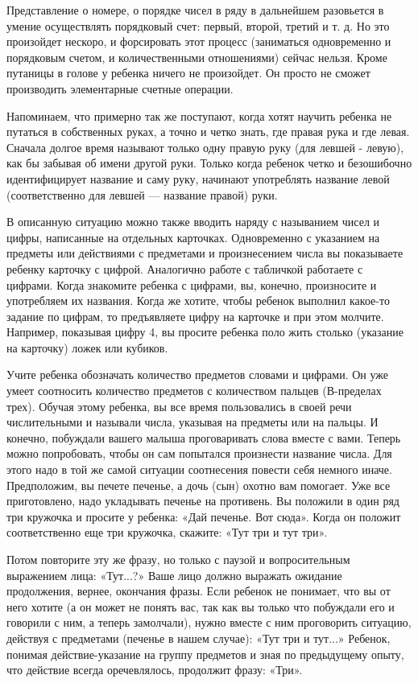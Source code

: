 \documentclass{book}
\begin{document}
Представление о номере, о порядке чисел в ряду в дальнейшем разовьется в
умение осуществлять порядковый счет: первый, второй, третий и т. д. Но
это произойдет нескоро, и форсировать этот процесс (заниматься
одновременно и порядковым счетом, и количественными отношениями) сейчас
нельзя. Кроме путаницы в голове у ребенка ничего не произойдет. Он
просто не сможет производить элементарные счетные операции.

Напоминаем, что примерно так же поступают, когда хотят научить ребенка
не путаться в собственных руках, а точно и четко знать, где правая рука
и где левая. Сначала долгое время называют только одну правую руку (для
левшей - левую), как бы забывая об имени другой руки. Только когда
ребенок четко и безошибочно идентифицирует название и саму руку,
начинают употреблять название левой (соответственно для левшей ---
название правой) руки.

В описанную ситуацию можно также вводить наряду с называнием чисел и
цифры, написанные на отдельных карточках. Одновременно с указанием на
предметы или действиями с предметами и произнесением числа вы
показываете ребенку карточку с цифрой. Аналогично работе с табличкой
работаете с цифрами. Когда знакомите ребенка с цифрами, вы, конечно,
произносите и употребляем их названия. Когда же хотите, чтобы ребенок
выполнил какое-то задание по цифрам, то предъявляете цифру на карточке и
при этом молчите. Например, показывая цифру 4, вы просите ребенка поло
жить столько (указание на карточку) ложек или кубиков.

Учите ребенка обозначать количество предметов словами и цифрами. Он уже
умеет соотносить количество предметов с количеством пальцев (В-пределах
трех). Обучая этому ребенка, вы все время пользовались в своей речи
числительными и называли числа, указывая на предметы или на пальцы. И
конечно, побуждали вашего малыша проговаривать слова вместе с вами.
Теперь можно попробовать, чтобы он сам попытался произнести название
числа. Для этого надо в той же самой ситуации соотнесения повести себя
немного иначе. Предположим, вы печете печенье, а дочь (сын) охотно вам
помогает. Уже все приготовлено, надо укладывать печенье на противень. Вы
положили в один ряд три кружочка и просите у ребенка: «Дай печенье. Вот
сюда». Когда он положит соответственно еще три кружочка, скажите: «Тут
три и тут три».

Потом повторите эту же фразу, но только с паузой и вопросительным
выражением лица: «Тут...?» Ваше лицо должно выражать ожидание
продолжения, вернее, окончания фразы. Если ребенок не понимает, что вы
от него хотите (а он может не понять вас, так как вы только что
побуждали его и говорили с ним, а теперь замолчали), нужно вместе с ним
проговорить ситуацию, действуя с предметами (печенье в нашем случае):
«Тут три и тут...» Ребенок, понимая действие-указание на группу
предметов и зная по предыдущему опыту, что действие всегда оречевлялось,
продолжит фразу: «Три».
\end{document}
